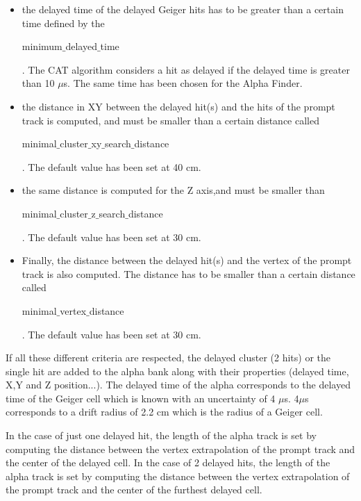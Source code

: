 \documentclass[main.tex]{subfiles}
\begin{document}
\begin{itemize}


\item the delayed time of the delayed Geiger hits has to be greater than a certain time defined by the \begin{ttfamily}minimum$\_$delayed$\_$time\end{ttfamily}. The CAT algorithm considers a hit as delayed if the delayed time is greater than 10 $\mu$s. The same time has been chosen for the Alpha Finder.


\item the distance in XY between the delayed hit(s) and the hits of the prompt track is computed, and must be smaller than a certain distance called \\
\begin{ttfamily}minimal$\_$cluster$\_$xy$\_$search$\_$distance\end{ttfamily}. The default value has been set at 40 cm.


\item the same distance is computed for the Z axis,and must be smaller than \\
 \begin{ttfamily}minimal$\_$cluster$\_$z$\_$search$\_$distance\end{ttfamily}. The default value has been set at 30 cm.


\item Finally, the distance between the delayed hit(s) and the vertex of the prompt track is also computed. The distance has to be smaller than a certain distance called \begin{ttfamily}minimal$\_$vertex$\_$distance\end{ttfamily}. The default value has been set at 30 cm.


\end{itemize}


\noindent If all these different criteria are respected, the delayed cluster (2 hits) or the single hit are added to the alpha bank along with their properties (delayed time, X,Y and Z position...). The delayed time of the alpha corresponds to the delayed time of the Geiger cell which is known with an uncertainty of 4 $\mu$s. 4$\mu$s corresponds to a drift radius of 2.2 cm which is the radius of a Geiger cell. 


\bigskip


\noindent In the case of just one delayed hit, the length of the alpha track is set by computing the distance between the vertex extrapolation of the prompt track and the center of the delayed cell. In the case of 2 delayed hits, the length of the alpha track is set by computing the distance between the vertex extrapolation of the prompt track and the center of the furthest delayed cell.
\end{document}
